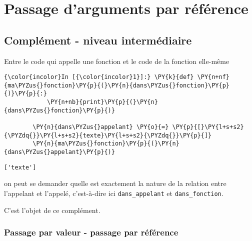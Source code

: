     
    
    
    

    

    \hypertarget{passage-darguments-par-ruxe9fuxe9rence}{%
\section{Passage d'arguments par
référence}\label{passage-darguments-par-ruxe9fuxe9rence}}

    \hypertarget{compluxe9ment---niveau-intermuxe9diaire}{%
\subsection{Complément - niveau
intermédiaire}\label{compluxe9ment---niveau-intermuxe9diaire}}

    Entre le code qui appelle une fonction et le code de la fonction
elle-même

    \begin{Verbatim}[commandchars=\\\{\}]
{\color{incolor}In [{\color{incolor}1}]:} \PY{k}{def} \PY{n+nf}{ma\PYZus{}fonction}\PY{p}{(}\PY{n}{dans\PYZus{}fonction}\PY{p}{)}\PY{p}{:}
            \PY{n+nb}{print}\PY{p}{(}\PY{n}{dans\PYZus{}fonction}\PY{p}{)}
            
        \PY{n}{dans\PYZus{}appelant} \PY{o}{=} \PY{p}{[}\PY{l+s+s2}{\PYZdq{}}\PY{l+s+s2}{texte}\PY{l+s+s2}{\PYZdq{}}\PY{p}{]}
        \PY{n}{ma\PYZus{}fonction}\PY{p}{(}\PY{n}{dans\PYZus{}appelant}\PY{p}{)}
\end{Verbatim}


    \begin{Verbatim}[commandchars=\\\{\}]
['texte']

    \end{Verbatim}

    on peut se demander quelle est exactement la nature de la relation entre
l'appelant et l'appelé, c'est-à-dire ici \texttt{dans\_appelant} et
\texttt{dans\_fonction}.

C'est l'objet de ce complément.

    \hypertarget{passage-par-valeur---passage-par-ruxe9fuxe9rence}{%
\subsubsection{Passage par valeur - passage par
référence}\label{passage-par-valeur---passage-par-ruxe9fuxe9rence}}

